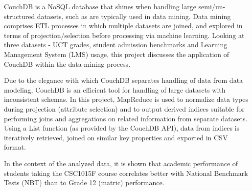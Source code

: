 CouchDB is a NoSQL database that shines when handling large semi/un-structured datasets, such as are typically used in data mining. Data mining comprises ETL processes in which multiple datasets are joined, and explored in terms of projection/selection before processing via machine learning. Looking at three datasets - UCT grades, student admission benchmarks and Learning Management System (LMS) usage, this project discusses the application of CouchDB within the data-mining process.

Due to the elegance with which CouchDB separates handling of data from data modeling, CouchDB is an efficient tool for handling of large datasets with inconsistent schemas. In this project, MapReduce is used to normalize data types during projection (attribute selection) and to output derived indices suitable for performing joins and aggregations on related information from separate datasets. Using a List function (as provided by the CouchDB API), data from indices is iteratively retrieved, joined on similar key properties and exported in CSV format.

In the context of the analyzed data, it is shown that academic performance of students taking the CSC1015F course correlates better with National Benchmark Tests (NBT) than to Grade 12 (matric) performance.